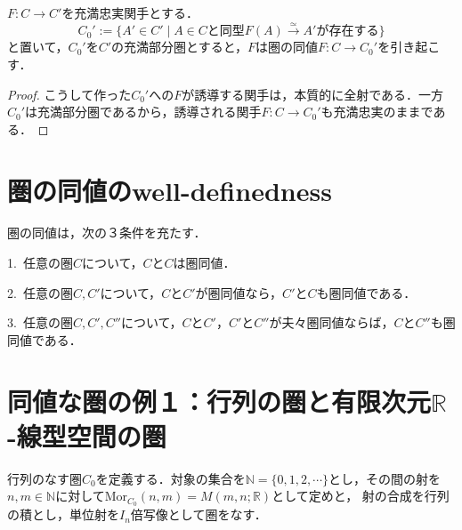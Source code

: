 \documentclass[uplatex, 12pt, dvipdfmx]{jsreport}
\begin{document}
\begin{corollary}
    $F:C\to C'$を充満忠実関手とする．
    $$C_0':=\{ A'\in C'\mid A\in Cと同型F(A)\xrightarrow{\simeq}A'が存在する \}$$
    と置いて，$C_0'$を$C'$の充満部分圏とすると，$F$は圏の同値$F:C\to C_0'$を引き起こす．
\end{corollary}
\begin{proof}
    こうして作った$C_0'$への$F$が誘導する関手は，本質的に全射である．一方$C_0'$は充満部分圏であるから，誘導される関手$F:C\to C_0'$も充満忠実のままである．
\end{proof}

\section{圏の同値のwell-definedness}

\begin{proposition} \label{prop-welldefinedness equivalence of categories}
    圏の同値は，次の３条件を充たす．\rm{}

    1.\, 任意の圏$C$について，$C$と$C$は圏同値．

    2.\, 任意の圏$C,C'$について，$C$と$C'$が圏同値なら，$C'$と$C$も圏同値である．

    3.\, 任意の圏$C,C',C''$について，$C$と$C'$，$C'$と$C''$が夫々圏同値ならば，$C$と$C''$も圏同値である．
\end{proposition}

\section{同値な圏の例１：行列の圏と有限次元$\mathbb{R}$-線型空間の圏}

行列のなす圏$C_0$を定義する．対象の集合を$\mathbb{N}=\{0,1,2,\cdots\}$とし，その間の射を$n,m\in\mathbb{N}$に対して$\mathrm{Mor}_{C_0}(n,m)=M(m,n;\mathbb{R})$として定めと，
射の合成を行列の積とし，単位射を$I_n$倍写像として圏をなす．
\end{document}
